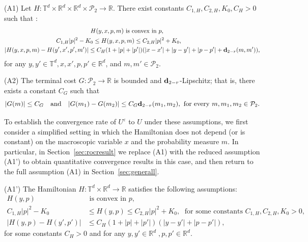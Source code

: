 \documentclass[reqno,11pt]{amsart}
\numberwithin{equation}{section}
\newcommand{\be}{\begin{equation}}
\newcommand{\ee}{\end{equation}}
\newcommand{\R}{\mathbb{R}} %
\newcommand{\ep}{\varepsilon}
\newcommand{\T}{\mathbb{T}}
\newcommand{\nd}{\noindent}
\begin{document}
\nd
(A1) Let $H:\T^d\times\R^d\times\R^d \times \mathcal{P}_2 \rightarrow \R$. There exist constants  $C_{1,H},C_{2,H},K_0,C_H>0 $ such that :
\begin{align}
&\hspace{5cm}H(y,x,p,m) \text{ is convex in }p, \\
    &\hspace{3cm}C_{1, H}|p|^{2} -K_0\le H(y,x,p,m) \leq C_{2, H}|p|^{2}+K_0, \label{quadgrowthHm}\\
    &|H(y,x,p,m)-H(y',x',p',m')|\le C_H(1+|p|+|p'|)(|x-x'|+|y-y'|+|p-p'|+{\bf d}_{2-r}(m,m')),\label{ineqHm}
\end{align}
for any $y, y'\in \T^d, x, x',p,p'\in \R^d$, and $m,m'\in \mathcal{P}_2$.
\vspace{1mm}

\nd
(A2) The terminal cost $G:\mathcal{P}_2\rightarrow \R$ is bounded and ${\bf d}_{2-r}$-Lipschitz; that is, there exists a constant $C_G$ such that
\be\label{terminalassumption}
|G(m)|\le C_G\quad\text{and}\quad |G(m_1)-G(m_2)|\le C_G {\bf d}_{2-r}(m_1,m_2), \text{ for every }m,m_1,m_2\in\mathcal{P}_2.
\ee

\vspace{3mm}

To establish the convergence rate of $U^\ep$ to $U$ under these assumptions, we first consider a simplified setting in which the Hamiltonian does not depend (or is constant) on the macroscopic variable $x$ and the probability measure $m$. In particular, in Section~\ref{sec:rocresult} we replace (A1) with the reduced assumption (A1') to obtain quantitative convergence results in this case, and then return to the full assumption (A1) in Section~\ref{sec:generall}.

\vspace{3mm}

\nd
(A1') The Hamiltonian $H:\T^d\times\R^d \rightarrow \R$ satisfies the following assumptions:
\begin{align}
H(y,p) &\text{ is convex in }p, \\
    C_{1, H}|p|^{2} -K_0&\le H(y,p) \leq C_{2, H}|p|^{2}+K_0,\;\text{ for some constants } C_{1, H}, C_{2, H}, K_0>
    0, \label{quadgrowth}\\
    |H(y,p)-H(y',p')|&\le C_H(1+|p|+|p'|)(|y-y'|+|p-p'|),\label{ineq}
\end{align}
for some constants $C_H>0$ and for any $y,y'\in \R^d\; ,p,p'\in \R^d$.
\vspace{2mm}
\end{document}
